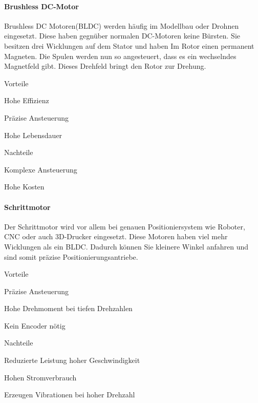 \paragraph{Brushless DC-Motor}

Brushless DC Motoren(BLDC) werden häufig im Modellbau oder Drohnen eingesetzt. Diese haben gegnüber normalen DC-Motoren keine Bürsten. Sie besitzen drei Wicklungen auf dem Stator und haben Im Rotor einen permanent Magneten. Die Spulen werden nun so angesteuert, dass es ein wechselndes Magnetfeld gibt. Dieses Drehfeld bringt den Rotor zur Drehung. 

\begin{minipage}[t]{0.48\textwidth}
\begin{items}
  \item [Vorteile]
  \item Hohe Effizienz
  \item Präzise Ansteuerung
  \item Hohe Lebensdauer
\end{items}
\end{minipage}
\hfill
\begin{minipage}[t]{0.48\textwidth}
\begin{items}
  \item [Nachteile]
  \item Komplexe Ansteuerung
  \item Hohe Kosten
\end{items}
\end{minipage}


\paragraph{Schrittmotor}

Der Schrittmotor wird vor allem bei genauen Positioniersystem wie Roboter, CNC oder auch 3D-Drucker eingesetzt. Diese Motoren haben viel mehr Wicklungen als ein BLDC. Dadurch können Sie kleinere Winkel anfahren und sind somit präzise Positionierungsantriebe. 

\begin{minipage}[t]{0.48\textwidth}
\begin{items}
  \item [Vorteile]
  \item Präzise Ansteuerung
  \item Hohe Drehmoment bei tiefen Drehzahlen
  \item Kein Encoder nötig
\end{items}
\end{minipage}
\hfill
\begin{minipage}[t]{0.48\textwidth}
\begin{items}
  \item [Nachteile]
  \item Reduzierte Leistung hoher Geschwindigkeit
  \item Hohen Stromverbrauch
  \item Erzeugen Vibrationen bei hoher Drehzahl
\end{items}
\end{minipage}

